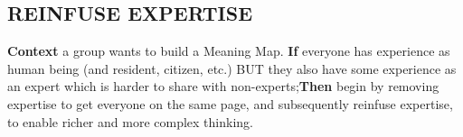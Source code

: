 \subsection*{REINFUSE EXPERTISE {\hfill \motor}}

\textbf{Context} a group wants to build a {\sc Meaning Map}.\newline
\textbf{If} everyone has experience as human being (and resident,
citizen, etc.) BUT they also have some experience as an expert which
is harder to share with non-experts;\newline \textbf{Then} begin by
removing expertise to get everyone on the same page, and subsequently
reinfuse expertise, to enable richer and more complex thinking.
